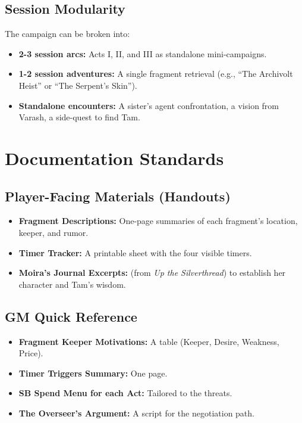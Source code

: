 \documentclass[11pt]{article}
\begin{document}
\subsection{Session Modularity}
The campaign can be broken into:
\begin{itemize}
    \item \textbf{2-3 session arcs:} Acts I, II, and III as standalone mini-campaigns.
    \item \textbf{1-2 session adventures:} A single fragment retrieval (e.g., ``The Archivolt Heist'' or ``The Serpent's Skin'').
    \item \textbf{Standalone encounters:} A sister's agent confrontation, a vision from Varash, a side-quest to find Tam.
\end{itemize}

\section{Documentation Standards}

\subsection{Player-Facing Materials (Handouts)}
\begin{itemize}
    \item \textbf{Fragment Descriptions:} One-page summaries of each fragment's location, keeper, and rumor.
    \item \textbf{Timer Tracker:} A printable sheet with the four visible timers.
    \item \textbf{Moira's Journal Excerpts:} (from \textit{Up the Silverthread}) to establish her character and Tam's wisdom.
\end{itemize}

\subsection{GM Quick Reference}
\begin{itemize}
    \item \textbf{Fragment Keeper Motivations:} A table (Keeper, Desire, Weakness, Price).
    \item \textbf{Timer Triggers Summary:} One page.
    \item \textbf{SB Spend Menu for each Act:} Tailored to the threats.
    \item \textbf{The Overseer's Argument:} A script for the negotiation path.
\end{itemize}
\end{document}
